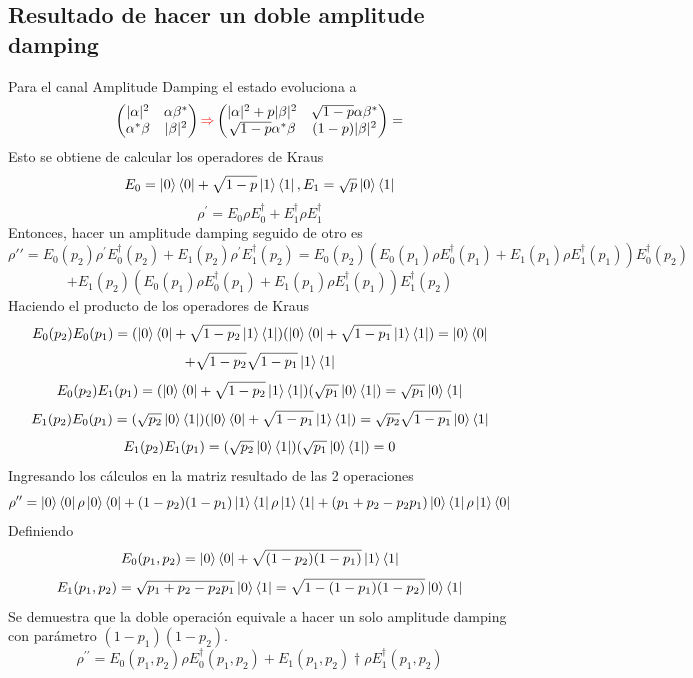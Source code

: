 \documentclass{book}
\begin{document}
\subsection{Resultado de hacer un doble amplitude damping} Para el canal Amplitude Damping el estado evoluciona a $$ \begin{pmatrix} \lvert\alpha\rvert^2 & \alpha\beta^* \\ \alpha^*\beta& \lvert\beta\rvert^2 \end{pmatrix} \textcolor{red}{\Rightarrow} \begin{pmatrix} \lvert\alpha\rvert^2+p\lvert\beta\rvert^2 &\sqrt{1-p}\alpha\beta^* \\ \sqrt{1-p}\alpha^*\beta& (1-p)\lvert\beta\rvert^2\end{pmatrix}= $$
Esto se obtiene de calcular los operadores de Kraus
$$E_0=\ket{0}\bra{0}+\sqrt{1-p}\ket{1}\bra{1}, E_1=\sqrt{p}\ket{0}\bra{1}$$
$$\rho^\prime=E_0\rho E_0^\dag+E_1^\dag \rho E_1^\dag$$
Entonces, hacer un amplitude damping seguido de otro es
$$\rho{\prime\prime}=E_0(p_2)\rho^\prime E_0^\dag(p_2)+E_1(p_2)\rho^\prime E_1^\dag(p_2)=E_0(p_2)(E_0(p_1)\rho E_0^\dag(p_1)+E_1(p_1) \rho E_1^\dag (p_1))E_0^\dag(p_2)$$ $$+E_1(p_2)(E_0(p_1)\rho E_0^\dag(p_1)+E_1(p_1) \rho E_1^\dag (p_1)) E_1^\dag(p_2)$$
Haciendo el producto de los operadores de Kraus
$$E_0(p_2)E_0(p_1)=(\ket{0}\bra{0}+\sqrt{1-p_2}\ket{1}\bra{1})(\ket{0}\bra{0}+\sqrt{1-p_1}\ket{1}\bra{1})=\ket{0}\bra{0}$$ $$+\sqrt{1-p_2}\sqrt{1-p_1}\ket{1}\bra{1} $$ 
$$E_0(p_2)E_1(p_1)=(\ket{0}\bra{0}+\sqrt{1-p_2}\ket{1}\bra{1})(\sqrt{p_1}\ket{0}\bra{1})=\sqrt{p_1}\ket{0}\bra{1}$$
$$E_1(p_2)E_0(p_1)=(\sqrt{p_2}\ket{0}\bra{1})(\ket{0}\bra{0}+\sqrt{1-p_1}\ket{1}\bra{1})=\sqrt{p_2}\sqrt{1-p_1}\ket{0}\bra{1}$$
$$E_1(p_2)E_1(p_1)=(\sqrt{p_2}\ket{0}\bra{1})(\sqrt{p_1}\ket{0}\bra{1})=0$$ Ingresando los cálculos en la matriz resultado de las 2 operaciones $$\rho^{\prime\prime}=\ket{0}\bra{0}\rho\ket{0}\bra{0}+(1-p_2)(1-p_1)\ket{1}\bra{1}\rho\ket{1}\bra{1}+(p_1+p_2-p_2p_1)\ket{0}\bra{1}\rho\ket{1}\bra{0} $$
Definiendo
$$ E_0(p_1,p_2)=\ket{0}\bra{0}+\sqrt{(1-p_2)(1-p_1)}\ket{1}\bra{1}$$
$$ E_1(p_1,p_2)=\sqrt{p_1+p_2-p_2p_1}\ket{0}\bra{1}=\sqrt{1-(1-p_1)(1-p_2)}\ket{0}\bra{1}$$
Se demuestra que la doble operación equivale a hacer un solo amplitude damping con parámetro $(1-p_1)(1-p_2)$.
$$\rho^{\prime\prime}=E_0(p_1,p_2)\rho E_0^\dag(p_1,p_2)+E_1(p_1,p_2)\dag \rho E_1^\dag(p_1,p_2)$$
\end{document}

